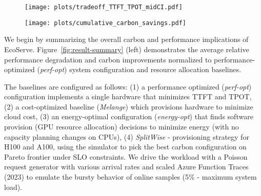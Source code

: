 \begin{figure*}
  \centering
    \centering
    \begin{subfigure}{0.6\textwidth}
\centering
    \texttt{[image: plots/tradeoff\_TTFT\_TPOT\_midCI.pdf]}\vspace{-0.03in}
\vspace{-0.03in}
    \end{subfigure}
    \begin{subfigure}{0.38\textwidth}
      \centering
      \hspace{-0.9in} 
       \texttt{[image: plots/cumulative\_carbon\_savings.pdf]}\vspace{-0.08in} \label{fig:decompose-4R}
    \end{subfigure}
    \caption{Carbon vs. performance trade-off. Lower-right is better. (Left, Center) We compare EcoServe to performance, energy, and cost (Melange) optimized baselines for prompt latency (TTFT, center) and generation latency (TPOT, left). We show the individual improvements (i.e., reuse, reduce, rightsize, recycle) as well as the aggregated benefit.
    EcoServe achieves up to 47\% carbon reduction at comparable performance.
    (Right) Under different workload mixes, we show the cumulative benefits of successively applying EcoServe's optimizations to online and offline capacity. All experiments assume iso-throughput.}
    \vspace{-1em}
    \label{fig:result-summary}
\end{figure*}


We begin by summarizing the overall carbon and performance implications of EcoServe.
Figure~\ref{fig:result-summary} (left) demonstrates the average relative performance degradation and carbon improvements normalized to performance-optimized (\textit{perf-opt}) system configuration and resource allocation baselines. 

The baselines are configured as follows: (1)
a performance optimized (\textit{perf-opt}) configuration implements a single hardware that minimizes TTFT and TPOT, 
(2) a cost-optimized baseline (\textit{Melange}) which provisions hardware to minimize cloud cost, 
(3) an energy-optimal configuration (\textit{energy-opt}) that finds software provision (GPU resource allocation) decisions to minimize energy (with no capacity planning changes on CPUs), (4) \textit{SplitWise} -  provisioning strategy for H100 and A100, using the simulator to pick the best carbon configuration on Pareto frontier under SLO constraints.  
We drive the workload with a Poisson request generator with various arrival rates and scaled Azure Function Traces (2023) to emulate the bursty behavior of online samples (5\% - maximum system load). 





